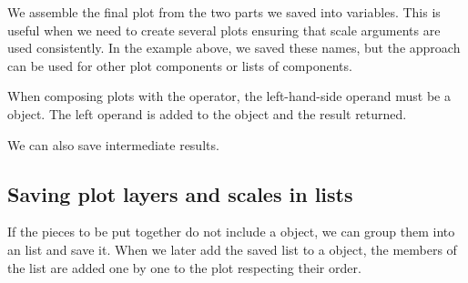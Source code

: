 \documentclass[krantz2]{krantz}\usepackage{knitr}
\begin{document}
We assemble the final plot from the two parts we saved into variables. This is useful when we need to create several plots ensuring that scale  arguments are used consistently. In the example above, we saved these names, but the approach can be used for other plot components or lists of components.

\begin{warningbox}
 When composing plots with the \code{+} operator, the left-hand-side operand must be a  object. The left operand is added to the  object and the result returned.
\end{warningbox}

\begin{knitrout}\footnotesize
{}\color{fgcolor}\begin{kframe}
\begin{alltt}
 \hlopt{+}  \hlopt{+} \hlstd{(}\hlstd{)}
 \hlopt{+}  \hlopt{+} \hlstd{(}\hlstd{)} \hlopt{+} \hlstd{(}\hlstd{,} \hlstd{)}
\end{alltt}
\end{kframe}
\end{knitrout}

We can also save intermediate results.

\begin{knitrout}\footnotesize
{}\color{fgcolor}\begin{kframe}
\begin{alltt}
 \hlkwb{<-}  \hlopt{+} \hlstd{(}\hlstd{=}\hlstd{(}\hlstd{,}\hlstd{))}
 \hlopt{+}  \hlopt{+} \hlstd{(}\hlstd{)}
\end{alltt}
\end{kframe}
\end{knitrout}

\subsection{Saving plot layers and scales in lists}

If the pieces to be put together do not include a  object, we can group them into an \Rlang list and save it. When we later add the saved list to a  object, the members of the list are added one by one to the plot respecting their order.
\end{document}
